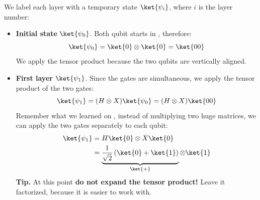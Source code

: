\noindent
We label each layer with a temporary state $\ket{\psi_i}$, where $i$ is the layer number:
\begin{itemize}
    \item \textbf{Initial state} $\ket{\psi_0}$. Both qubit starts in , therefore:
    \begin{equation*}
        \ket{\psi_0} = \ket{0} \otimes \ket{0} = \ket{00}
    \end{equation*}
    We apply the tensor product because the two qubits are vertically aligned.


    \item \textbf{First layer} $\ket{\psi_1}$. Since the gates are simultaneous, we apply the tensor product of the two gates:
    \begin{equation*}
        \ket{\psi_1} = (H \otimes X) \ket{\psi_0} = (H \otimes X) \ket{00}
    \end{equation*}
    Remember what we learned on , instead of multiplying two huge matrices, we can apply the two gates separately to each qubit:
    \begin{align*}
        \ket{\psi_1} &= H\ket{0} \otimes X\ket{0} \\
        &= \underbrace{\frac{1}{\sqrt{2}} \left(\ket{0} + \ket{1}\right)}_{\ket{+}} \otimes \ket{1}
    \end{align*}
    \textcolor{Green3}{ \textbf{Tip.}} At this point \textbf{do not expand the tensor product!} Leave it factorized, because it is easier to work with.



\end{itemize}
